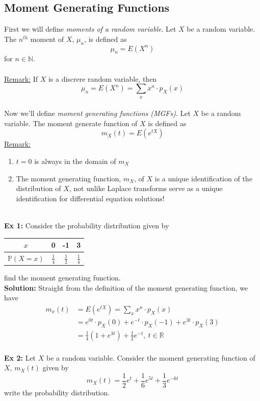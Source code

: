 \documentclass{article}
\newcommand{\ti}[1]{\textit{#1}}
\newcommand{\N}{\mathbb{N}}
\newcommand{\R}{\mathbb{R}}
\newcommand{\bbP}{\mathbb{P}}
\newcommand{\x}{\cdot}
\begin{document}
\subsection{Moment Generating Functions}
First we will define \ti{moments of a random variable}. Let $X$ be a random variable. The $n^{th}$ moment of $X$, $\mu_{n}$, is defined as
\[\mu_{n} = E(X^{n})\]
for $n \in \N$.\\\\
\underline{Remark:} If $X$ is  a discrere random variable, then
\[\mu_{n} = E(X^{n}) = \sum_{x} x^{n}\x p_{X}(x)\]\\
Now we'll define \ti{moment generating functions (MGFs)}. Let $X$ be a random variable. The moment generate function of $X$ is defined as
\[m_{X}(t) = E(e^{tX})\]
\underline{Remark:}
\begin{enumerate}
	\item $t=0$ is always in the domain of $m_{X}$
	\item The moment generating function, $m_{X}$, of $X$ is a unique identification of the distribution of $X$, not unlike Laplace transforms serve as a unique identification for differential equation solutions!
\end{enumerate}
\ \\
\textbf{Ex 1:} Consider the probability distribution given by
\begin{center}
\begin{tabular}{| c || c | c | c |}
\hline
$x$ & 0 & -1 & 3\\
\hline
$\bbP(X=x)$ & $\frac{1}{4}$ & $\frac{1}{2}$ &  $\frac{1}{4}$\\
\hline
\end{tabular}
\end{center}
find the moment generating function.\\
\textbf{Solution:} Straight from the definition of the moment generating function, we have
\begin{align*}
	m_{x}(t) &= E(e^{tX}) = \sum_{x} x^{n}\x p_{X}(x)\\
			&= e^{0t}\x p_{X}(0) + e^{-t}\x p_{X}(-1) + e^{3t}\x p_{X}(3)\\
			&= \frac{1}{4}(1+e^{3t}) + \frac{1}{2}e^{-t},\ t \in \R
\end{align*}
\ \\
\textbf{Ex 2:} Let $X$ be a random variable. Consider the moment generating function of $X$, $m_{X}(t)$ given by
\[m_{X}(t) = \frac{1}{2}e^{t} + \frac{1}{6}e^{5t} + \frac{1}{3}e^{-6t}\]
write the probability distribution.\\\\\\
\end{document}
